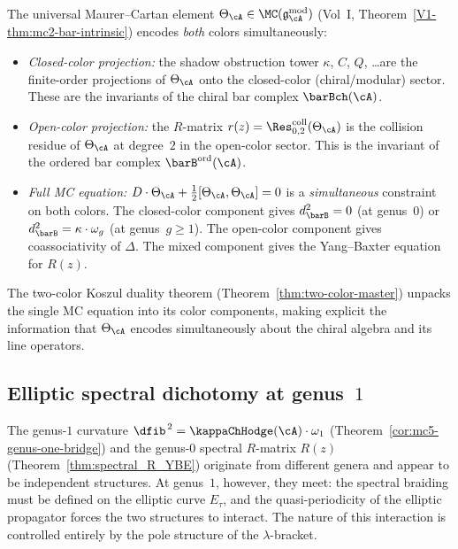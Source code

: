 \begin{remark}
The universal Maurer--Cartan element
$\Theta_\cA \in \MC(\mathfrak{g}_\cA^{\mathrm{mod}})$
(Vol~I, Theorem~\ref*{V1-thm:mc2-bar-intrinsic}) encodes
\emph{both} colors simultaneously:
\begin{itemize}
\item \emph{Closed-color projection:} the shadow obstruction
 tower $\kappa$, $C$, $Q$, \ldots are the finite-order
 projections of $\Theta_\cA$ onto the closed-color
 (chiral/modular) sector. These are the invariants of the
 chiral bar complex $\barBch(\cA)$.
\item \emph{Open-color projection:} the $R$-matrix
 $r(z) = \Res^{\mathrm{coll}}_{0,2}(\Theta_\cA)$
 is the collision residue of $\Theta_\cA$ at degree~$2$
 in the open-color sector. This is the invariant of the
 ordered bar complex $\barB^{\mathrm{ord}}(\cA)$.
\item \emph{Full MC equation:} $D \cdot \Theta_\cA
 + \tfrac{1}{2}[\Theta_\cA, \Theta_\cA] = 0$
 is a \emph{simultaneous} constraint on both colors. The
 closed-color component gives $d_{\barB}^2 = 0$ (at
 genus~$0$) or $d_{\barB}^2 = \kappa \cdot \omega_g$ (at
 genus~$g \ge 1$). The open-color component gives
 coassociativity of $\Delta$. The mixed component gives
 the Yang--Baxter equation for $R(z)$.
\end{itemize}
The two-color Koszul duality theorem
(Theorem~\ref{thm:two-color-master}) unpacks the single MC
equation into its color components, making explicit the
information that $\Theta_\cA$ encodes simultaneously about
the chiral algebra and its line operators.
\end{remark}



\subsection{Elliptic spectral dichotomy at genus~$1$}

The genus-$1$ curvature $\dfib^{\,2} = \kappaChHodge(\cA)\cdot\omega_1$
(Theorem~\ref{cor:mc5-genus-one-bridge}) and the genus-$0$ spectral
$R$-matrix $R(z)$ (Theorem~\ref{thm:spectral_R_YBE}) originate from
different genera and appear to be independent structures. At genus~$1$,
however, they meet: the spectral braiding must be defined on the
elliptic curve $E_\tau$, and the quasi-periodicity of the elliptic
propagator forces the two structures to interact. The nature of this
interaction is controlled entirely by the pole structure of the
$\lambda$-bracket.

